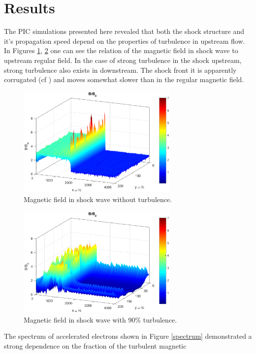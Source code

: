 \documentclass[a4paper]{jpconf}
\begin{document}
\section{Results}
The PIC simulations presented here  revealed that both the shock structure  and  it's propagation speed depend on the properties of turbulence in upstream flow. In Figures \ref{regularB}, \ref{turbulentB} one can see the relation of the magnetic field in shock wave to upstream regular field. In the case of strong turbulence in the shock upstream,  
strong turbulence also exists in downstream. The shock front  it is apparently corrugated (cf \cite{2016ApJ...827...44L}) and moves somewhat slower than in 
the regular magnetic field.

\begin{figure}[h!]
		\centering
		\includegraphics[width=0.7\textwidth]{fig/regular_field.eps} 
		\caption{Magnetic field in shock wave without turbulence.}
		\label{regularB}
\end{figure}
\begin{figure}[h!]
		\centering
		\includegraphics[width=0.7\textwidth]{fig/turbulent_field.eps} 
		\caption{Magnetic field in shock wave with 90\% turbulence.}
		\label{turbulentB}
\end{figure}
The spectrum of accelerated electrons  shown in Figure \ref{spectrum}  demonstrated a strong dependence on the fraction of the turbulent magnetic 
\end{document}
